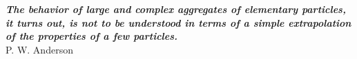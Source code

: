 \thispagestyle{empty}
\hbox{} \vfill
\begin{flushright}
\small \textit{\textbf{The behavior of large and complex aggregates of elementary particles, it turns out, is not to be understood in terms of a simple extrapolation of the properties of a few particles.}}
\\ \vspace{2mm}  
\scriptsize P. W. Anderson
\end{flushright}

\clearpage
\thispagestyle{empty}
\cleardoublepage